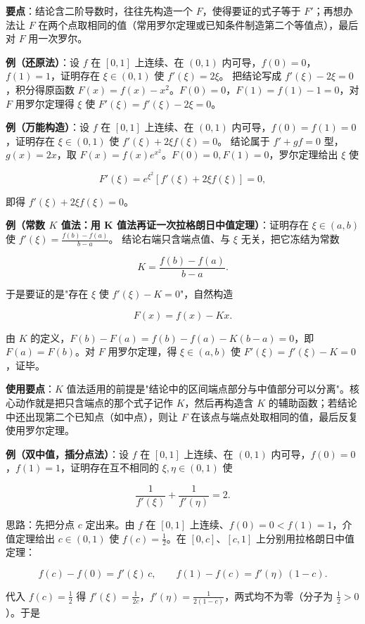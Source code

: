 \documentclass[11pt,openany,UTF8]{ctexbook}
\begin{document}
\textbf{要点}：结论含二阶导数时，往往先构造一个 $F$，使得要证的式子等于 $F'$；再想办法让 $F$ 在两个点取相同的值（常用罗尔定理或已知条件制造第二个等值点），最后对 $F$ 用一次罗尔。

\textbf{例（还原法）}：设 $f$ 在 $[0,1]$ 上连续、在 $(0,1)$ 内可导，$f(0)=0$，$f(1)=1$，证明存在 $\xi\in(0,1)$ 使 $f'(\xi)=2\xi$。 把结论写成 $f'(\xi)-2\xi=0$，积分得原函数 $F(x)=f(x)-x^2$。$F(0)=0$，$F(1)=f(1)-1=0$，对 $F$ 用罗尔定理得 $\xi$ 使 $F'(\xi)=f'(\xi)-2\xi=0$。

\textbf{例（万能构造）}：设 $f$ 在 $[0,1]$ 上连续、在 $(0,1)$ 内可导，$f(0)=f(1)=0$，证明存在 $\xi\in(0,1)$ 使 $f'(\xi)+2\xi f(\xi)=0$。 结论属于 $f'+g f=0$ 型，$g(x)=2x$，取 $F(x)=f(x)e^{x^2}$。$F(0)=0,F(1)=0$，罗尔定理给出 $\xi$ 使

\[F'(\xi)=e^{\xi^2}\left[f'(\xi)+2\xi f(\xi)\right]=0,\]

即得 $f'(\xi)+2\xi f(\xi)=0$。

\textbf{例（常数 $K$ 值法：用 K 值法再证一次拉格朗日中值定理）}：证明存在 $\xi\in(a,b)$ 使 $f'(\xi)=\frac{f(b)-f(a)}{b-a}$。 结论右端只含端点值、与 $\xi$ 无关，把它冻结为常数

\[K=\frac{f(b)-f(a)}{b-a}.\]

于是要证的是"存在 $\xi$ 使 $f'(\xi)-K=0$"，自然构造

\[F(x)=f(x)-Kx .\]

由 $K$ 的定义，$F(b)-F(a)=f(b)-f(a)-K(b-a)=0$，即 $F(a)=F(b)$。对 $F$ 用罗尔定理，得 $\xi\in(a,b)$ 使 $F'(\xi)=f'(\xi)-K=0$，证毕。

\textbf{使用要点}：$K$ 值法适用的前提是"结论中的区间端点部分与中值部分可以分离"。核心动作就是把只含端点的那个式子记作 $K$，然后再构造含 $K$ 的辅助函数；若结论中还出现第二个已知点（如中点），则让 $F$ 在该点与端点处取相同的值，最后反复使用罗尔定理。

\textbf{例（双中值，插分点法）}：设 $f$ 在 $[0,1]$ 上连续、在 $(0,1)$ 内可导，$f(0)=0$，$f(1)=1$，证明存在互不相同的 $\xi,\eta\in(0,1)$ 使

\[\frac{1}{f'(\xi)}+\frac{1}{f'(\eta)}=2 .\]

思路：先把分点 $c$ 定出来。由 $f$ 在 $[0,1]$ 上连续、$f(0)=0<f(1)=1$，介值定理给出 $c\in(0,1)$ 使 $f(c)=\frac12$。在 $[0,c]$、$[c,1]$ 上分别用拉格朗日中值定理：

\[f(c)-f(0)=f'(\xi)\,c,\qquad f(1)-f(c)=f'(\eta)\,(1-c).\]

代入 $f(c)=\frac12$ 得 $f'(\xi)=\frac{1}{2c}$，$f'(\eta)=\frac{1}{2(1-c)}$，两式均不为零（分子为 $\frac12>0$）。于是
\end{document}
